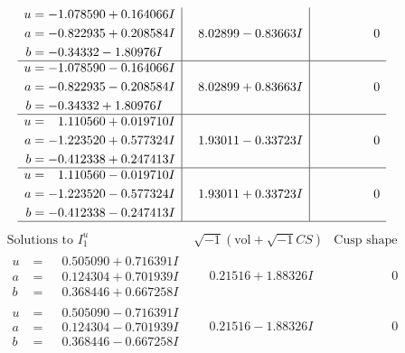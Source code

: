 \documentclass[1p]{elsarticle_modified}
\theoremstyle{definition}
\newcommand{\I}{\sqrt{-1}}
\begin{document}
$$\begin{array}{c|c|c}
\begin{aligned}
u &= -1.078590 + 0.164066 I \\
a &= -0.822935 + 0.208584 I \\
b &= -0.34332 - 1.80976 I\end{aligned}
 & \phantom{-}8.02899 - 0.83663 I & \phantom{-0.000000 } 0 \\ \hline\begin{aligned}
u &= -1.078590 - 0.164066 I \\
a &= -0.822935 - 0.208584 I \\
b &= -0.34332 + 1.80976 I\end{aligned}
 & \phantom{-}8.02899 + 0.83663 I & \phantom{-0.000000 } 0 \\ \hline\begin{aligned}
u &= \phantom{-}1.110560 + 0.019710 I \\
a &= -1.223520 + 0.577324 I \\
b &= -0.412338 + 0.247413 I\end{aligned}
 & \phantom{-}1.93011 - 0.33723 I & \phantom{-0.000000 } 0 \\ \hline\begin{aligned}
u &= \phantom{-}1.110560 - 0.019710 I \\
a &= -1.223520 - 0.577324 I \\
b &= -0.412338 - 0.247413 I\end{aligned}
 & \phantom{-}1.93011 + 0.33723 I & \phantom{-0.000000 } 0\\
 \hline 
 \end{array}$$\newpage$$\begin{array}{c|c|c}  
\text{Solutions to }I^u_{1}& \I (\text{vol} + \sqrt{-1}CS) & \text{Cusp shape}\\
 \hline 
\begin{aligned}
u &= \phantom{-}0.505090 + 0.716391 I \\
a &= \phantom{-}0.124304 + 0.701939 I \\
b &= \phantom{-}0.368446 + 0.667258 I\end{aligned}
 & \phantom{-}0.21516 + 1.88326 I & \phantom{-0.000000 } 0 \\ \hline\begin{aligned}
u &= \phantom{-}0.505090 - 0.716391 I \\
a &= \phantom{-}0.124304 - 0.701939 I \\
b &= \phantom{-}0.368446 - 0.667258 I\end{aligned}
 & \phantom{-}0.21516 - 1.88326 I & \phantom{-0.000000 } 0 \\ \hline\begin{aligned}

\end{aligned}
\end{array}$$
\end{document}

